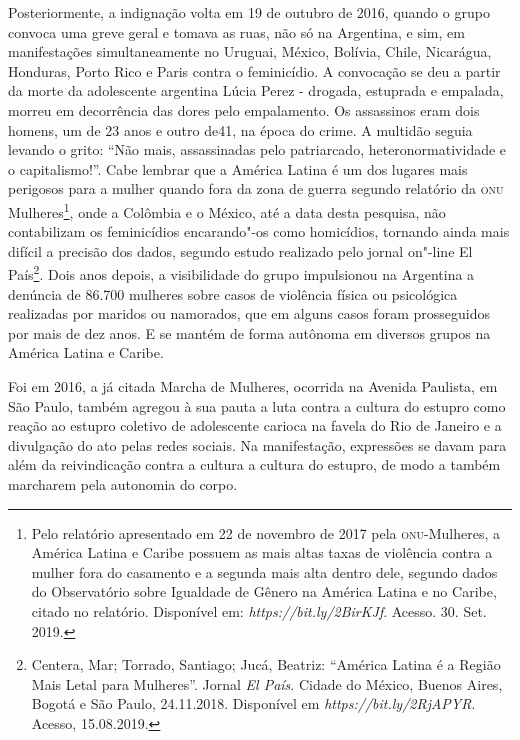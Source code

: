 Posteriormente, a indignação volta em 19 de outubro de 2016, quando o
grupo convoca uma greve geral e tomava as ruas, não só na Argentina, e
sim, em manifestações simultaneamente no Uruguai, México, Bolívia,
Chile, Nicarágua, Honduras, Porto Rico e Paris contra o feminicídio. A
convocação se deu a partir da morte da adolescente argentina Lúcia Perez
- drogada, estuprada e empalada, morreu em decorrência das dores pelo
empalamento. Os assassinos eram dois homens, um de 23 anos e outro de41,
na época do crime. A multidão seguia levando o grito: ``Não mais,
assassinadas pelo patriarcado, heteronormatividade e o capitalismo!''.
Cabe lembrar que a América Latina é um dos lugares mais perigosos para a
mulher quando fora da zona de guerra segundo relatório da \textsc{onu}
Mulheres\footnote{Pelo relatório apresentado em 22 de novembro de 2017
  pela \textsc{onu}-Mulheres, a América Latina e Caribe possuem as mais altas
  taxas de violência contra a mulher fora do casamento e a segunda mais
  alta dentro dele, segundo dados do Observatório sobre Igualdade de
  Gênero na América Latina e no Caribe, citado no relatório. Disponível
  em:
  \emph{https://bit.ly/2BirKJf}.
  Acesso. 30. Set. 2019.}, onde a Colômbia e o México, até a data desta
pesquisa, não contabilizam os feminicídios encarando"-os como homicídios,
tornando ainda mais difícil a precisão dos dados, segundo estudo
realizado pelo jornal on"-line El País\footnote{Centera, Mar; Torrado,
  Santiago; Jucá, Beatriz: ``América Latina é a Região Mais Letal para
  Mulheres''. Jornal \emph{El País}. Cidade do México, Buenos Aires,
  Bogotá e São Paulo, 24.11.2018. Disponível em
  \emph{https://bit.ly/2RjAPYR}.
  Acesso, 15.08.2019.}. Dois anos depois, a visibilidade do grupo
impulsionou na Argentina a denúncia de 86.700 mulheres sobre casos de
violência física ou psicológica realizadas por maridos ou namorados, que
em alguns casos foram prosseguidos por mais de dez anos. E se mantém de
forma autônoma em diversos grupos na América Latina e Caribe.

Foi em 2016, a já citada Marcha de Mulheres, ocorrida na Avenida
Paulista, em São Paulo, também agregou à sua pauta a luta contra a
cultura do estupro como reação ao estupro coletivo de adolescente
carioca na favela do Rio de Janeiro e a divulgação do ato pelas redes
sociais. Na manifestação, expressões se davam para além da reivindicação
contra a cultura a cultura do estupro, de modo a também marcharem pela
autonomia do corpo.


